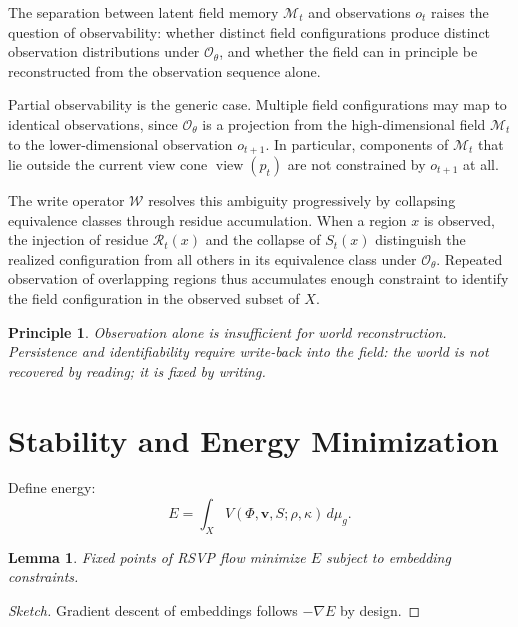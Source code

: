 \documentclass[11pt]{article}
\newtheorem{lemma}[theorem]{Lemma}
\newtheorem{principle}{Principle}
\begin{document}
The separation between latent field memory $\mathcal{M}_t$ and
observations $o_t$ raises the question of observability: whether distinct
field configurations produce distinct observation distributions under
$\mathcal{O}_\theta$, and whether the field can in principle be
reconstructed from the observation sequence alone.

Partial observability is the generic case.
Multiple field configurations may map to identical observations, since
$\mathcal{O}_\theta$ is a projection from the high-dimensional field
$\mathcal{M}_t$ to the lower-dimensional observation $o_{t+1}$.
In particular, components of $\mathcal{M}_t$ that lie outside the current
view cone $\operatorname{view}(p_t)$ are not constrained by $o_{t+1}$ at
all.

The write operator $\mathcal{W}$ resolves this ambiguity progressively by
collapsing equivalence classes through residue accumulation.
When a region $x$ is observed, the injection of residue $\mathcal{R}_t(x)$
and the collapse of $S_t(x)$ distinguish the realized configuration from
all others in its equivalence class under $\mathcal{O}_\theta$.
Repeated observation of overlapping regions thus accumulates enough
constraint to identify the field configuration in the observed subset of
$X$.

\begin{principle}
Observation alone is insufficient for world reconstruction.
Persistence and identifiability require write-back into the field: the
world is not recovered by reading; it is fixed by writing.
\end{principle}

\section{Stability and Energy Minimization}

Define energy:
\[
E = \int_X V(\Phi,\mathbf{v},S;\rho,\kappa)\, d\mu_g.
\]

\begin{lemma}
Fixed points of RSVP flow minimize $E$ subject to embedding constraints.
\end{lemma}

\begin{proof}[Sketch]
Gradient descent of embeddings follows $-\nabla E$ by design.
\end{proof}

\end{document}
